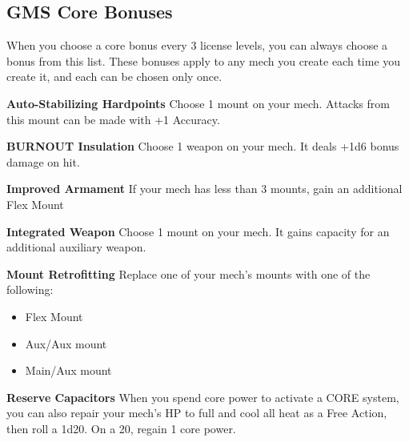 \subsection{GMS Core Bonuses}
When you choose a core bonus every 3 license levels, you can always choose a bonus from this list. These bonuses apply to any mech you create each time you create it, and each can be chosen only once.


\textbf{Auto-Stabilizing Hardpoints}\newline
Choose 1 mount on your mech. Attacks from this mount can be made with +1 Accuracy.


\textbf{BURNOUT Insulation}\newline
Choose 1 weapon on your mech. It deals +1d6 bonus damage on hit.


\textbf{Improved Armament}\newline
If your mech has less than 3 mounts, gain an additional Flex Mount


\textbf{Integrated Weapon}\newline
Choose 1 mount on your mech. It gains capacity for an additional auxiliary weapon.


\textbf{Mount Retrofitting}\newline
Replace one of your mech's mounts with one of the following:
\begin{itemize}
\item Flex Mount
\item Aux/Aux mount
\item Main/Aux mount
\end{itemize}

\textbf{Reserve Capacitors}\newline
When you spend core power to activate a CORE system, you can also repair your mech's HP to full and cool all heat as a Free Action, then roll a 1d20. On a 20, regain 1 core power.

